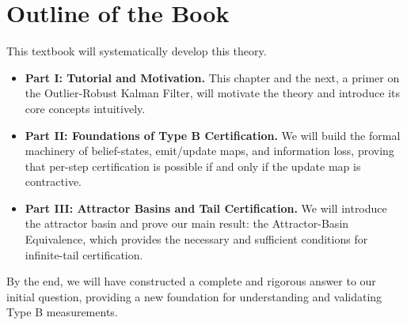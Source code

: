 \documentclass[12pt]{article}
\begin{document}
\section{Outline of the Book}

This textbook will systematically develop this theory.
\begin{itemize}
    \item \textbf{Part I: Tutorial and Motivation.} This chapter and the next, a primer on the Outlier-Robust Kalman Filter, will motivate the theory and introduce its core concepts intuitively.
    \item \textbf{Part II: Foundations of Type B Certification.} We will build the formal machinery of belief-states, emit/update maps, and information loss, proving that per-step certification is possible if and only if the update map is contractive.
    \item \textbf{Part III: Attractor Basins and Tail Certification.} We will introduce the attractor basin and prove our main result: the Attractor-Basin Equivalence, which provides the necessary and sufficient conditions for infinite-tail certification.
\end{itemize}

By the end, we will have constructed a complete and rigorous answer to our initial question, providing a new foundation for understanding and validating Type B measurements.
\end{document}

